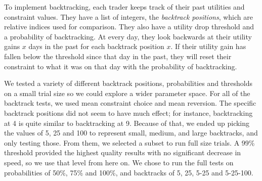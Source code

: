 \documentclass[12pt,a4paper,titlepage]{article}
\newcommand{\co}[1]{\textsf{#1}}
\begin{document}
To implement backtracking, each trader keeps track of their past utilities and constraint values.
They have a list of integers, the \textit{backtrack positions}, which are relative indices used for comparison.
They also have a utility drop threshold and a probability of backtracking.
At every day, they look backwards at their utility gains $x$ days in the past for each backtrack position $x$.
If their utility gain has fallen below the threshold since that day in the past, they will reset their constraint to what it was on that day with the probability of backtracking.

We tested a variety of different backtrack positions, probabilities and thresholds on a small trial size so we could explore a wider parameter space.
For all of the backtrack tests, we used \co{mean} constraint choice and \co{mean} reversion.
The specific backtrack positions did not seem to have much effect; for instance, backtracking at 4 is quite similar to backtracking at 9. 
Because of that, we ended up picking the values of 5, 25 and 100 to represent small, medium, and large backtracks, and only testing those.
From them, we selected a subset to run full size trials.
A 99\% threshold provided the highest quality results with no significant decrease in speed, so we use that level from here on.
We chose to run the full tests on probabilities of 50\%, 75\% and 100\%, and backtracks of 5, 25, 5-25 and 5-25-100. 
\end{document}
